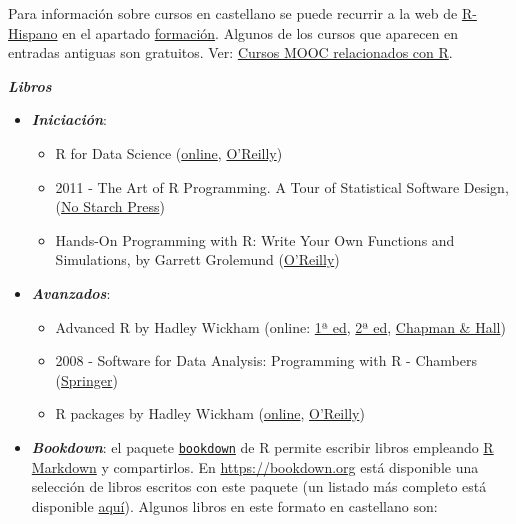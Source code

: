 \documentclass[]{book}
\begin{document}
Para información sobre cursos en castellano se puede recurrir a la web de \href{http://r-es.org/}{R-Hispano} en el apartado \href{http://r-es.org/category/formacion}{formación}. Algunos de los cursos que aparecen en entradas antiguas son gratuitos.
Ver: \href{http://r-es.org/2016/02/12/cursos-masivos-y-otra-formacion-on-line-sobre-r/}{Cursos MOOC relacionados con R}.

\textbf{\emph{Libros}}

\begin{itemize}
\item
  \textbf{\emph{Iniciación}}:

  \begin{itemize}
  \item
    R for Data Science
    (\href{http://r4ds.had.co.nz/}{online}, \href{http://shop.oreilly.com/product/0636920034407.do}{O'Reilly})
  \item
    2011 - The Art of R Programming. A Tour of Statistical Software Design,
    (\href{https://www.nostarch.com/artofr.htm}{No Starch Press})
  \item
    Hands-On Programming with R: Write Your Own Functions and Simulations,
    by Garrett Grolemund
    (\href{http://shop.oreilly.com/product/0636920028574.do}{O'Reilly})
  \end{itemize}
\item
  \textbf{\emph{Avanzados}}:

  \begin{itemize}
  \item
    Advanced R by Hadley Wickham
    (online: \href{http://adv-r.had.co.nz/}{1ª ed},
    \href{https://adv-r.hadley.nz/}{2ª ed},
    \href{https://www.amazon.com/dp/1466586966}{Chapman \& Hall})
  \item
    2008 - Software for Data Analysis: Programming with R - Chambers
    (\href{http://www.springer.com/la/book/9780387759357}{Springer})
  \item
    R packages by Hadley Wickham
    (\href{http://r-pkgs.had.co.nz/}{online},
    \href{http://shop.oreilly.com/product/0636920034421.do}{O'Reilly})
  \end{itemize}
\item
  \textbf{\emph{Bookdown}}:
  el paquete \href{https://bookdown.org}{\texttt{bookdown}} de R permite escribir libros empleando
  \href{http://rmarkdown.rstudio.com}{R Markdown} y compartirlos.
  En \url{https://bookdown.org} está disponible una selección de libros escritos con este paquete
  (un listado más completo está disponible \href{https://bookdown.org/home/archive/}{aquí}).
  Algunos libros en este formato en castellano son:


\end{itemize}
\end{document}
